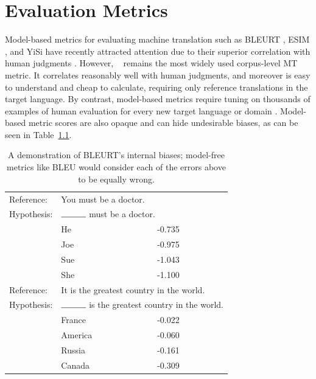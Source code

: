 \chapter{Evaluation Metrics}
\label{ch:eval-metrics}

Model-based metrics for evaluating machine translation such as BLEURT \cite{sellam-etal-2020-bleurt}, ESIM \cite{mathur-etal-2019-ESIM}, and YiSi \cite{lo-2019-yisi} have recently attracted attention due to their superior correlation with human judgments \cite{WMT19-metrics-proceedings}. However, \bleu~\cite{papineni-etal-2002-bleu} remains  the most widely used corpus-level MT metric. It correlates reasonably well with human judgments, and moreover is easy to understand and cheap to calculate, requiring only reference translations in the target language. By contrast, model-based metrics require tuning on thousands of examples of human evaluation for every new target language or domain \cite{sellam-etal-2020-bleurt}. Model-based metric scores are also opaque and can hide undesirable biases, as can be seen in Table~\ref{tab:bleurt-bias}.


\begin{table}[ht]
    \centering
    \begin{tabular}{l l l }
Reference:& \multicolumn{2}{l}{You must be a doctor.} \\
Hypothesis: & \multicolumn{2}{l}{$\rule{1cm}{0.15mm}$ must be a doctor.} \\
    & He	&-0.735 \\
    & Joe & -0.975 \\
    & Sue & -1.043 \\
    & She	 &-1.100 \\\hline
Reference:& \multicolumn{2}{l}{It is the greatest country in the world.} \\
Hypothesis:& \multicolumn{2}{l}{$\rule{1cm}{0.15mm}$ is the greatest country in the world.} \\
    & France &	-0.022 \\
    & America	& -0.060 \\
    & Russia &	-0.161 \\
    & Canada  & -0.309 
    \end{tabular}
    \caption{A demonstration of BLEURT's internal biases; model-free metrics like BLEU would consider each of the errors above to be equally wrong.}
    \label{tab:bleurt-bias}
\end{table}

